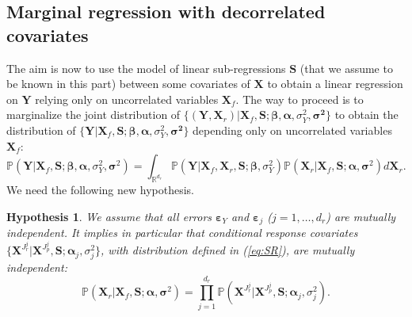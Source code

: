 \documentclass[11pt,a4paper]{article}
\newtheorem{hyp}{Hypothesis}
\begin{document}
\subsection{Marginal regression with decorrelated covariates}
The aim is now to use the model of linear sub-regressions $\boldsymbol{S}$ (that we assume to be known in this part) between some covariates of $\boldsymbol{X}$ to obtain a linear regression on $\boldsymbol{Y}$ relying only on uncorrelated variables $\boldsymbol{X}_f$.  The way to proceed is to marginalize the joint distribution of $\{(\boldsymbol{Y},\boldsymbol{X}_r) |\boldsymbol{X}_f,\boldsymbol{S};\boldsymbol{\beta},\boldsymbol{\alpha},\sigma_Y^2,\boldsymbol{\sigma^2}\}$ to obtain the distribution of $\{\boldsymbol{Y} |\boldsymbol{X}_f,\boldsymbol{S};\boldsymbol{\beta},\boldsymbol{\alpha},\sigma_Y^2,\boldsymbol{\sigma^2}\}$ depending only on uncorrelated variables $\boldsymbol{X}_f$:
\begin{equation}\label{eq:marginal}
\mathbb{P}(\boldsymbol{Y} |\boldsymbol{X}_f,\boldsymbol{S};\boldsymbol{\beta},\boldsymbol{\alpha},\sigma_Y^2,\boldsymbol{\sigma}^2) = \int_{{\mathbb{R}^{d_r}}}\mathbb{P}(\boldsymbol{Y}| \boldsymbol{X}_f,\boldsymbol{X}_r,\boldsymbol{S};\boldsymbol{\beta},\sigma_Y^2) \mathbb{P}(\boldsymbol{X}_r | \boldsymbol{X}_f,\boldsymbol{S};\boldsymbol{\alpha},\boldsymbol{\sigma}^2) d\boldsymbol{X}_r.
\end{equation}
We need the following new hypothesis.

\begin{hyp}\label{H3}
We assume that all errors $\boldsymbol{\varepsilon}_Y$ and $\boldsymbol{\varepsilon}_j$ ($j=1,\ldots,d_r$) are {\it mutually independent}. It implies in particular that conditional response covariates $\{\boldsymbol{X}^{J_{r}^j}|\boldsymbol{X}^{J_{p}^j},\boldsymbol{S};\boldsymbol{\alpha}_j,\sigma^2_j\}$, with distribution defined in (\ref{eq:SR}), are {\it mutually independent}:
\begin{equation}\label{eq:H3}
\mathbb{P}(\boldsymbol{X}_r | \boldsymbol{X}_f,\boldsymbol{S};\boldsymbol{\alpha},\boldsymbol{\sigma}^2) = \prod_{j=1}^{d_r} \mathbb{P}(\boldsymbol{X}^{J_{r}^j}|\boldsymbol{X}^{J_{p}^j},\boldsymbol{S};\boldsymbol{\alpha}_j,\sigma^2_j).
\end{equation}
\end{hyp}

\vspace{3mm}
\end{document}

